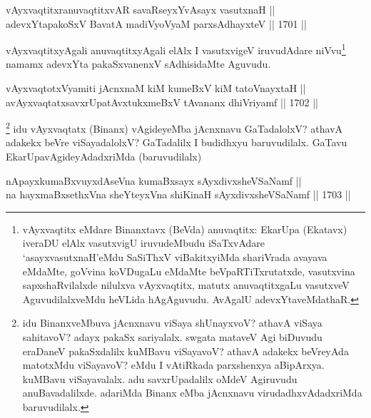 \begin{shl}
vAyxvaqtitxranuvaqtitxvAR savaRseyxYvAsayx vasutxnaH || \\
adevxYtapakoSxV BavatA madiVyoV\s yaM parxsAdhayxteV ||  1701 ||  
\end{shl}

\begin{artha}
vAyxvaqtitxyAgali anuvaqtitxyAgali elAlx I vasutxvigeV iruvudAdare niVvu\footnote{vAyxvaqtitx eMdare Binanxtavx (BeVda) anuvaqtitx: EkarUpa (Ekatavx) iveraDU elAlx vasutxvigU iruvudeMbudu iSaTxvAdare `asayxvasutxnaH'eMdu SaSiThxV viBakitxyiMda shariVrada avayava eMdaMte, goVvina koVDugaLu eMdaMte beVpaRTiTxrutatxde, vasutxvina sapxshaRvilalxde nilulxva vAyxvaqtitx, matutx anuvaqtitxgaLu vasutxveV AguvudilalxveMdu heVLida hAgAguvudu. AvAgalU adevxYtaveMdathaR.} namamx adevxYta pakaSxvanenxV sAdhisidaMte Aguvudu.
\end{artha}

\begin{shl}
vAyxvaqtotxV\s yamiti jAcnxnaM kiM kumeBxV kiM tatoV\s nayxtaH ||  \\
avAyxvaqtatxsavxrUpatAvxtukxmeBxV tAvananx dhiVriyamf ||  1702 ||  
\end{shl}

\begin{artha}
\footnote{idu BinanxveMbuva jAcnxnavu viSaya shUnayxvoV? athavA viSaya sahitavoV? adayx pakaSx sariyalalx. swgata mataveV Agi biDuvudu eraDaneV pakaSxdalilx kuMBavu viSayavoV? athavA adakekx beVreyAda matotxMdu viSayavoV? eMdu I vAtiRkada parxshenxya aBipArxya. kuMBavu viSayavalalx. adu savxrUpadalilx oMdeV Agiruvudu anuBavadalilxde. adariMda Binanx eMba jAcnxnavu virudadhxvAdadxriMda baruvudilalx.}
idu vAyxvaqtatx (Binanx) vAgideyeMba jAcnxnavu GaTadalolxV? athavA adakekx beVre viSayadalolxV? GaTadalilx I budidhxyu baruvudilalx. GaTavu EkarUpavAgideyAdadxriMda (baruvudilalx)
\end{artha}

\begin{shl}
nApayxkumaBxvuyxdAseVna kumaBxsayx sAyxdivxsheVSaNamf || \\
na hayxmaBxsethxVna sheYteyxVna shiKinaH sAyxdivxsheVSaNamf ||  1703 ||  
\end{shl}

